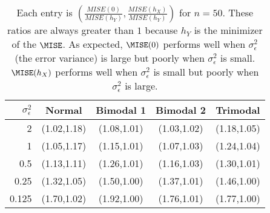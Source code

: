 \begin{table}[ht]
\centering
\begin{tabular}{r|cccc}
  \hline
$\sigma_{\epsilon}^2$ & Normal & Bimodal 1 & Bimodal 2 & Trimodal \\ 
  \hline
2 & (1.02,1.18) & (1.08,1.01) & (1.03,1.02) & (1.18,1.05) \\ 
  1 & (1.05,1.17) & (1.15,1.01) & (1.07,1.03) & (1.24,1.04) \\ 
  0.5 & (1.13,1.11) & (1.26,1.01) & (1.16,1.03) & (1.30,1.01) \\ 
  0.25 & (1.32,1.05) & (1.50,1.00) & (1.37,1.01) & (1.46,1.00) \\ 
  0.125 & (1.70,1.02) & (1.92,1.00) & (1.76,1.01) & (1.77,1.00) \\ 
   \hline
\end{tabular}
\caption{Each entry is $\left(\frac{MISE(0)}{MISE(h_Y)},\frac{MISE(h_X)}{MISE(h_Y)}\right)$ for $n=50$. These ratios are always greater than $1$ because $h_Y$ is the minimizer of the $\MISE$. As expected, $\MISE(0)$ performs well when $\sigma_{\epsilon}^2$ (the error variance) is large but poorly when $\sigma_{\epsilon}^2$ is small. $\MISE(h_X)$ performs well when $\sigma_{\epsilon}^2$ is small but poorly when $\sigma_{\epsilon}^2$ is large.} 
\label{tab:50}
\end{table}
